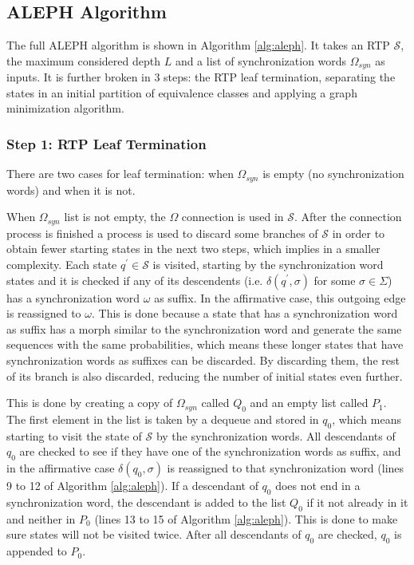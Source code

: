 {\subsection{ALEPH Algorithm}

The full ALEPH algorithm is shown in Algorithm \ref{alg:aleph}. It takes an RTP $\mathcal{S}$, the maximum considered depth $L$ and a list of synchronization words $\Omega_{syn}$ as inputs. It is further broken in 3 steps: the RTP leaf termination, separating the states in an initial partition of equivalence classes and applying a graph minimization algorithm.

\subsubsection{Step 1: RTP Leaf Termination}

There are two cases for leaf termination: when $\Omega_{syn}$ is empty (no synchronization words) and when it is not.

When  $\Omega_{syn}$ list is not empty, the $\Omega$ connection is used in $\mathcal{S}$. After the connection process is finished a process is used to discard some branches of $\mathcal{S}$ in order to obtain fewer starting states in the next two steps, which implies in a smaller complexity. Each state $q^{\prime}\in\mathcal{S}$ is visited, starting by the synchronization word states and it is checked if any of its descendents (i.e. $\delta(q^{\prime},\sigma)$ for some $\sigma \in \Sigma$) has a synchronization word $\omega$ as suffix. In the affirmative case, this outgoing edge is reassigned to $\omega$. This is done because a state that has a synchronization word as suffix has a morph similar to the synchronization word and generate the same sequences with the same probabilities, which means these longer states that have synchronization words as suffixes can be discarded. By discarding them, the rest of its branch is also discarded, reducing the number of initial states even further. 

This is done by creating a copy of $\Omega_{syn}$ called $Q_0$ and an empty list called $P_1$. The first element in the list is taken by a dequeue and stored in $q_0$, which means starting to visit the state of $\mathcal{S}$ by the synchronization words. All descendants of $q_0$ are checked to see if they have one of the synchronization words as suffix, and in the affirmative case $\delta(q_0,\sigma)$ is reassigned to that synchronization word (lines 9 to 12 of Algorithm \ref{alg:aleph}). If a descendant of $q_0$ does not end in a synchronization word, the descendant is added to the list $Q_0$ if it not already in it and neither in $P_0$ (lines 13 to 15 of Algorithm \ref{alg:aleph}). This is done to make sure states will not be visited twice. After all descendants of $q_0$ are checked, $q_0$ is appended to $P_0$.

}
